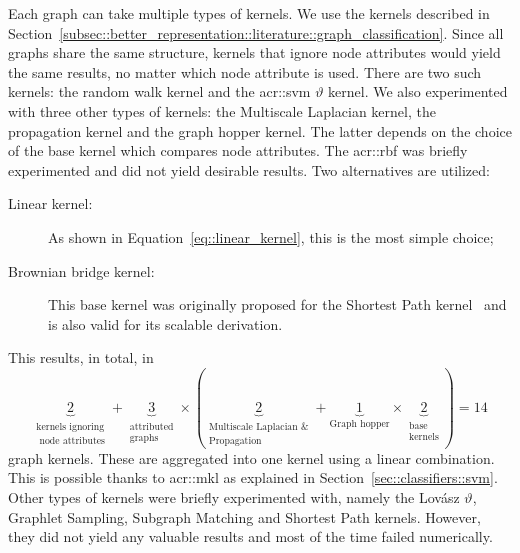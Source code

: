         Each graph can take multiple types of kernels.
        We use the kernels described in Section~\ref{subsec::better_representation::literature::graph_classification}.
        Since all graphs share the same structure, kernels that ignore node attributes would yield the same results, no matter which node attribute is used.
        There are two such kernels: the random walk kernel and the \gls{acr::svm} \(\vartheta\) kernel.
        We also experimented with three other types of kernels: the Multiscale Laplacian kernel, the propagation kernel and the graph hopper kernel.
        The latter depends on the choice of the base kernel which compares node attributes.
        The \gls{acr::rbf} was briefly experimented and did not yield desirable results.
        Two alternatives are utilized:
        \begin{description}
            \item[Linear kernel:] As shown in Equation~\ref{eq::linear_kernel}, this is the most simple choice;
            \item[Brownian bridge kernel:] This base kernel was originally proposed for the Shortest Path kernel~\parencite{borgwardt2005shortest} and is also valid for its scalable derivation.
        \end{description}
        This results, in total, in \begin{equation*}
            \underbrace{2}_{\substack{\text{kernels ignoring}\\\text{ node attributes}}} + \underbrace{3}_{\substack{\text{attributed}\\\text{graphs}}} \times \left(\underbrace{2}_{\substack{\text{Multiscale Laplacian \&}\\\text{Propagation}}} + \underbrace{1}_{\text{Graph hopper}} \times \underbrace{2}_{\substack{\text{base}\\\text{kernels}}}\right) = 14
        \end{equation*} graph kernels.
        These are aggregated into one kernel using a linear combination.
        This is possible thanks to \acrfull{acr::mkl} as explained in Section~\ref{sec::classifiers::svm}.
        Other types of kernels were briefly experimented with, namely the Lov\'asz \(\vartheta\), Graphlet Sampling, Subgraph Matching and Shortest Path kernels.
        However, they did not yield any valuable results and most of the time failed numerically.

